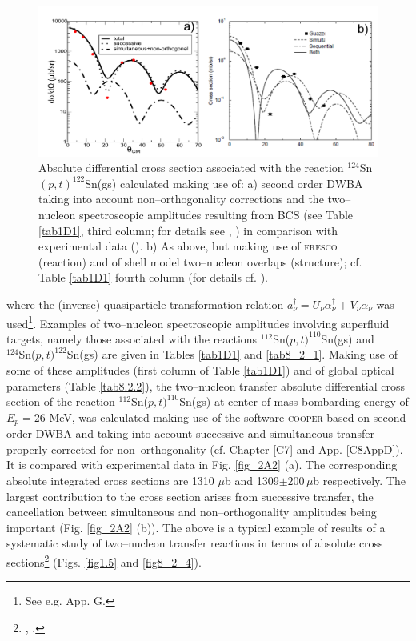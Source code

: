 \begin{figure}\label{fig2A3}
\centerline{\includegraphics*[width=\textwidth,angle=0]{nutshell/figs/fig2A3x.pdf}}
\caption{Absolute differential cross section associated with the reaction $^{124}$Sn$(p,t)^{122}$Sn(gs) calculated making use of: a) second order DWBA taking into account non--orthogonality corrections and the two--nucleon spectroscopic amplitudes resulting from BCS (see Table \ref{tab1D1}, third column; for details see \cite{Potel:13}, \cite{Potel:13b}) in comparison with experimental data (\cite{Guazzoni:11}). b) As above, but making use of \textsc{fresco} (reaction) and of shell model two--nucleon overlaps (structure); cf. Table \ref{tab1D1} fourth column (for details cf. \cite{Thompson:13}).}\label{fig_2A3}
\end{figure}
where the (inverse) quasiparticle transformation relation $a^{\dagger}_\nu=U_{\nu}\alpha^{\dagger}_{\nu}+V_{\nu}\alpha_{\bar{\nu}}$ was used\footnote{See e.g. \cite{Brink:05} App. G.}. Examples of  two--nucleon spectroscopic amplitudes involving superfluid targets, namely those associated with the reactions $^{112}$Sn($p,t)^{110}$Sn(gs) and\\ $^{124}$Sn($p,t)^{122}$Sn(gs) are given in Tables \ref{tab1D1} and \ref{tab8_2_1}. Making use of some of these amplitudes (first column of Table \ref{tab1D1}) and of global optical parameters (Table \ref{tab8.2.2}), the two--nucleon transfer absolute differential cross section of the reaction $^{112}$Sn($p,t)^{110}$Sn(gs) at center of mass bombarding energy of $E_p=26$ MeV, was calculated making use of the software \textsc{cooper} based on second order DWBA and taking into account successive and simultaneous transfer properly corrected for non--orthogonality (cf. Chapter \ref{C7} and App. \ref{C8AppD}). It is compared with experimental data in Fig. \ref{fig_2A2} (a). The corresponding absolute integrated cross sections are 1310 $\mu$b and 1309$\pm 200 \,\mu$b respectively. The largest contribution to the cross section arises from successive transfer, the cancellation between simultaneous and non--orthogonality amplitudes being important (Fig. \ref{fig_2A2} (b)). The above is a typical example of results of a systematic study of two--nucleon transfer reactions in terms of absolute cross sections\footnote{\cite{Potel:13}, \cite{Potel:13b}.} (Figs. \ref{fig1.5} and  \ref{fig8_2_4}).


